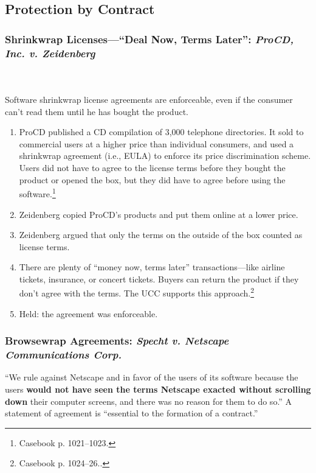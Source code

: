 \subsection{Protection by Contract}

\subsubsection{Shrinkwrap Licenses---``Deal Now, Terms Later'': \emph{ProCD, 
Inc. v. Zeidenberg}}
~\\\\
Software shrinkwrap license agreements are enforceable, even if the consumer 
can't read them until he has bought the product.

\begin{enumerate}
    \item ProCD published a CD compilation of 3,000 telephone directories. It 
    sold to commercial users at a higher price than individual consumers, and 
    used a shrinkwrap agreement (i.e., EULA) to enforce its price 
    discrimination scheme. Users did not have to agree to the license terms 
    before they bought the product or opened the box, but they did have to 
    agree before using the software.\footnote{Casebook p. 1021--1023.}
    \item Zeidenberg copied ProCD's products and put them online at a lower 
    price.
    \item Zeidenberg argued that only the terms on the outside of the box 
    counted as license terms.
    \item There are plenty of ``money now, terms later'' transactions---like 
    airline tickets, insurance, or concert tickets. Buyers can return the 
    product if they don't agree with the terms. The UCC supports this 
    approach.\footnote{Casebook p. 1024--26..}
    \item Held: the agreement was enforceable.
\end{enumerate}

\subsubsection{Browsewrap Agreements: \emph{Specht v. Netscape Communications 
Corp.}}

``We rule against Netscape and in favor of the users of its software because 
the users \textbf{would not have seen the terms Netscape exacted without 
scrolling down} their computer screens, and there was no reason for them to do 
so.'' A statement of agreement is ``essential to the formation of a 
contract.''

